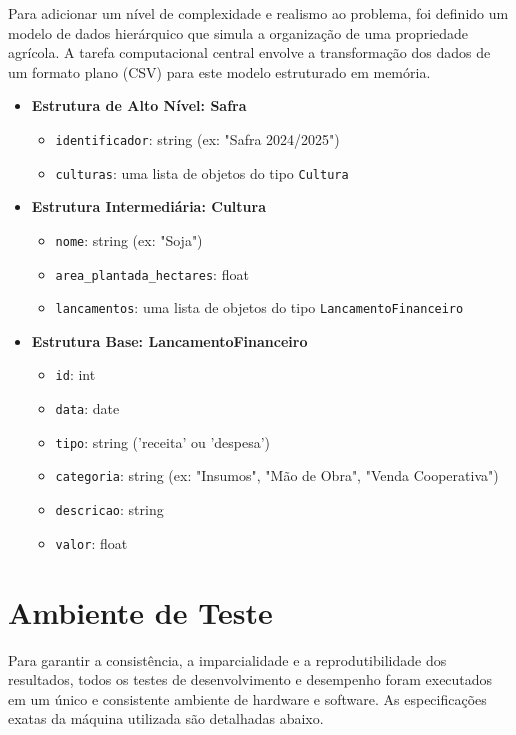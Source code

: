 Para adicionar um nível de complexidade e realismo ao problema, foi definido um modelo de dados hierárquico que simula a organização de uma propriedade agrícola. A tarefa computacional central envolve a transformação dos dados de um formato plano (CSV) para este modelo estruturado em memória.

\begin{itemize}
	\item \textbf{Estrutura de Alto Nível: Safra}
	\begin{itemize}
		\item \texttt{identificador}: string (ex: "Safra 2024/2025")
		\item \texttt{culturas}: uma lista de objetos do tipo \texttt{Cultura}
	\end{itemize}
	\item \textbf{Estrutura Intermediária: Cultura}
	\begin{itemize}
		\item \texttt{nome}: string (ex: "Soja")
		\item \texttt{area\_plantada\_hectares}: float
		\item \texttt{lancamentos}: uma lista de objetos do tipo \texttt{LancamentoFinanceiro}
	\end{itemize}
	\item \textbf{Estrutura Base: LancamentoFinanceiro}
	\begin{itemize}
		\item \texttt{id}: int
		\item \texttt{data}: date
		\item \texttt{tipo}: string ('receita' ou 'despesa')
		\item \texttt{categoria}: string (ex: "Insumos", "Mão de Obra", "Venda Cooperativa")
		\item \texttt{descricao}: string
		\item \texttt{valor}: float
	\end{itemize}
\end{itemize}

\section{Ambiente de Teste}
\label{sec:ambiente}

Para garantir a consistência, a imparcialidade e a reprodutibilidade dos resultados, todos os testes de desenvolvimento e desempenho foram executados em um único e consistente ambiente de hardware e software. As especificações exatas da máquina utilizada são detalhadas abaixo.

